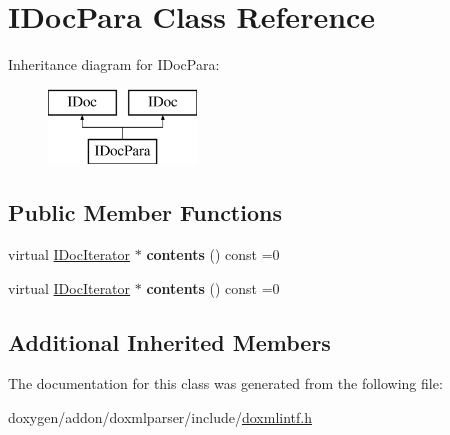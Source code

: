 \hypertarget{class_i_doc_para}{}\section{I\+Doc\+Para Class Reference}
\label{class_i_doc_para}
Inheritance diagram for I\+Doc\+Para\+:\begin{figure}[H]
\begin{center}
\leavevmode
\includegraphics[height=2.000000cm]{class_i_doc_para}
\end{center}
\end{figure}
\subsection*{Public Member Functions}
\begin{DoxyCompactItemize}
\item 
\mbox{\label{class_i_doc_para_a06f960945dceb02514b4079a1dbda288}} 
virtual \mbox{\hyperlink{class_i_doc_iterator}{I\+Doc\+Iterator}} $\ast$ {\bfseries contents} () const =0
\item 
\mbox{\label{class_i_doc_para_a06f960945dceb02514b4079a1dbda288}} 
virtual \mbox{\hyperlink{class_i_doc_iterator}{I\+Doc\+Iterator}} $\ast$ {\bfseries contents} () const =0
\end{DoxyCompactItemize}
\subsection*{Additional Inherited Members}


The documentation for this class was generated from the following file\+:\begin{DoxyCompactItemize}
\item 
doxygen/addon/doxmlparser/include/\mbox{\hyperlink{include_2doxmlintf_8h}{doxmlintf.\+h}}\end{DoxyCompactItemize}
